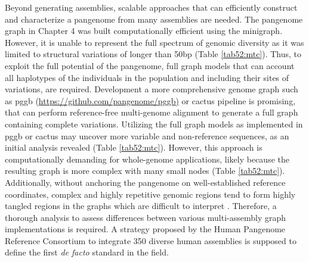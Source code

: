 \documentclass[../main.tex]{subfiles}
\begin{document}
Beyond generating assemblies, scalable approaches that can efficiently construct and characterize a pangenome from many assemblies are needed. The pangenome graph in Chapter 4 was built computationally efficient using the minigraph. However, it is unable to represent the full spectrum of genomic diversity as it was limited to structural variations of longer than 50bp (Table \ref{tab52:mtc}). Thus, to exploit the full potential of the pangenome, full graph models that can account all haplotypes of the individuals in the population and including their sites of variations, are required. Development a more comprehensive genome graph such as pggb (\url{https://github.com/pangenome/pggb)} or cactus \citep{armstrong2020progressive} pipeline is promising, that can perform reference-free multi-genome alignment to generate a full graph containing complete variations. Utilizing the full graph models as implemented in pggb or cactus may uncover more variable and non-reference sequences, as an initial analysis revealed (Table \ref{tab52:mtc}). However, this approach is computationally demanding for whole-genome applications, likely because the resulting graph is more complex with many small nodes (Table \ref{tab52:mtc}). Additionally, without anchoring the pangenome on well-established reference coordinates, complex and highly repetitive genomic regions tend to form highly tangled regions in the graphs which are difficult to interpret \citep{lei2021plant}. Therefore, a thorough analysis to assess differences between various multi-assembly graph implementations is required. A strategy proposed by the Human Pangenome Reference Consortium to integrate 350 diverse human assemblies is supposed to define the first \emph{de facto} standard in the field. 
\end{document}
